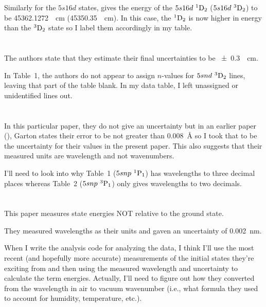 \documentclass{article}
\newcommand{\tsup}{\textsuperscript}													%
\newcommand{\tsub}{\textsubscript}														%
\newcommand{\SLJ}[3]{\tsup{#1}\textnormal{#2}\tsub{#3}}
\newcommand{\nSLJ}[4]{{#1}\textnormal{ }\SLJ{#2}{#3}{#4}}
\begin{document}
Similarly for the $5s16d$ states, \cite{san_2010} gives the energy of the $\nSLJ{5s16d}{1}{D}{2}$ ($\nSLJ{5s16d}{3}{D}{2}$) to be \SI{45362.1272}{\per\cm} (\SI{45350.35}{\per\cm}). In this case, the $\SLJ{1}{D}{2}$ is now higher in energy than the $\SLJ{3}{D}{2}$ state so I label them accordingly in my table.

\section{}

The authors state that they estimate their final uncertainties to be \SI{\pm 0.3}{\per\cm}. 

In Table~1, the authors do not appear to assign $n$-values for $\nSLJ{5snd}{3}{D}{2}$ lines, leaving that part of the table blank. In my data table, I left unassigned or unidentified lines out.

\section{}

In this particular paper, they do not give an uncertainty but in an earlier paper (\cite{gaw_1966}), Garton states their error to be not greater than \SI{0.008}{\angstrom} so I took that to be the uncertainty for their values in the present paper. This also suggests that their measured units are wavelength and not wavenumbers.

I'll need to look into why Table~1 ($\nSLJ{5snp}{1}{P}{1}$) has wavelengths to three decimal places whereas Table~2 ($\nSLJ{5snp}{3}{P}{1}$) only gives wavelengths to two decimals. 

\section{}

This paper measures state energies NOT relative to the ground state. 

They measured wavelengths as their units and gaven an uncertainty of \SI{0.002}{\nm}. 

When I write the analysis code for analyzing the data, I think I'll use the most recent (and hopefully more accurate) measurements of the initial states they're exciting from and then using the measured wavelength and uncertainty to calculate the term energies. Actually, I'll need to figure out how they converted from the wavelength in air to vacuum wavenumber (i.e., what formula they used to account for humidity, temperature, etc.). 
\end{document}
